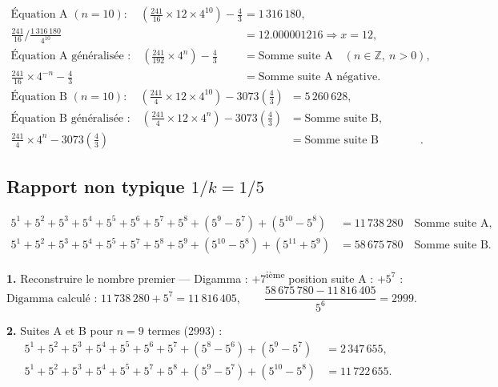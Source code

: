 \documentclass[11pt,a4paper]{article}
\begin{document}
\begin{boiteformule}
\begin{align*}
\text{Équation A }(n=10):\quad
\left(\frac{241}{16}\times12\times4^{10}\right)-\frac{4}{3}
&=1\,316\,180,\\
\frac{241}{16}\Big/\frac{1\,316\,180}{4^{10}}
&=12.000001216\Rightarrow x=12,\\
\text{Équation A généralisée :}\quad
\left(\frac{241}{192}\times4^{n}\right)-\frac{4}{3}
&=\text{Somme suite A}\quad(n\in\mathbb{Z},\ n>0),\\
\frac{241}{16}\times4^{-n}-\frac{4}{3}
&=\text{Somme suite A négative}.
\end{align*}
\begin{align*}
\text{Équation B }(n=10):\quad
\left(\frac{241}{4}\times12\times4^{10}\right)-3073\left(\frac{4}{3}\right)
&=5\,260\,628,\\
\text{Équation B généralisée :}\quad
\left(\frac{241}{4}\times12\times4^{n}\right)-3073\left(\frac{4}{3}\right)
&=\text{Somme suite B},\\
\frac{241}{4}\times4^{n}-3073\left(\frac{4}{3}\right)
&=\text{Somme suite B négative}.
\end{align*}
\end{boiteformule}

\subsection{Rapport non typique $1/k = 1/5$}

\begin{boiteformule}[Sommes des suites A et B --- rapport $1/5$, $n = 10$]
\begin{align*}
5^{1}+5^{2}+5^{3}+5^{4}+5^{5}+5^{6}+5^{7}+5^{8}+(5^{9}-5^{7})+(5^{10}-5^{8})
  &= 11\,738\,280 \quad \text{Somme suite A},\\
5^{1}+5^{2}+5^{3}+5^{4}+5^{5}+5^{7}+5^{8}+5^{9}+(5^{10}-5^{8})+(5^{11}+5^{9})
  &= 58\,675\,780 \quad \text{Somme suite B}.
\end{align*}
\end{boiteformule}

\textbf{1.} Reconstruire le nombre premier --- Digamma : $+$7\textsuperscript{ième}
position suite A : $+5^{7}$ :
\[
\text{Digamma calculé : } 11\,738\,280 + 5^{7} = 11\,816\,405,
\qquad
\frac{58\,675\,780 - 11\,816\,405}{5^{6}} = 2999.
\]

\textbf{2.} Suites A et B pour $n = 9$ termes (2993) :
\begin{align*}
5^{1}+5^{2}+5^{3}+5^{4}+5^{5}+5^{6}+5^{7}+(5^{8}-5^{6})+(5^{9}-5^{7}) &= 2\,347\,655,\\
5^{1}+5^{2}+5^{3}+5^{4}+5^{5}+5^{7}+5^{8}+(5^{9}-5^{7})+(5^{10}-5^{8}) &= 11\,722\,655.
\end{align*}
\end{document}
